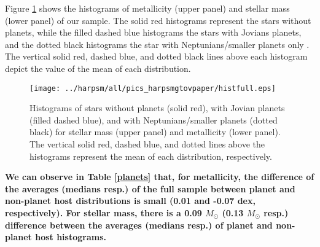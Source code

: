 \documentclass[structabstract]{aa}
\begin{document}

Figure \ref{histfull} shows the histograms of metallicity (upper panel) and stellar mass (lower panel) of our sample. The solid red histograms represent the stars without planets, while the filled dashed blue histograms the stars with Jovians planets, and the dotted black histograms the star with Neptunians/smaller planets only . The vertical solid red, dashed blue, and dotted black lines above each histogram depict the value of the mean of each distribution. 



\begin{figure}[h]
\begin{center}
\texttt{[image: ../harpsm/all/pics\_harpsmgtovpaper/histfull.eps]}
\end{center}
\caption{Histograms of stars without planets (solid red), with Jovian planets (filled dashed blue), and with Neptunians/smaller planets (dotted black) for stellar mass (upper panel) and metallicity (lower panel). The vertical solid red, dashed blue, and dotted lines above the histograms represent the mean of each distribution, respectively.}
\label{histfull}
\end{figure}


\textbf{We can observe in Table \ref{planets} that, for metallicity, the difference of the averages (medians resp.) of the full sample between planet and non-planet host distributions is small (0.01 and -0.07 dex, respectively). For stellar mass, there is a 0.09 $M_{\odot}$ (0.13 $M_{\odot}$ resp.) difference between the averages (medians resp.) of planet and non-planet host histograms.} 
\end{document}
